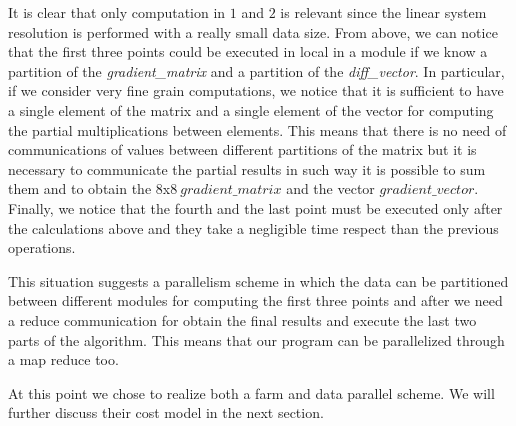 It is clear that only computation in $1$ and $2$ is relevant since the linear system resolution is performed with a really small data size.
From above, we can notice that the first three points could be executed in local in a module if we know a partition of the \textit{gradient\_matrix} and a partition of the \textit{diff\_vector}. In particular, if we consider very fine grain computations, we notice that it is sufficient to have a single element of the matrix and a single element of the vector for computing the partial multiplications between elements. This means that there is no need of communications of values between different partitions of the matrix but it is necessary to communicate the partial results in such way it is possible to sum them and to obtain the $8$x$8\ gradient\_matrix$ and the vector $gradient\_vector$. Finally, we notice that the fourth and the last point must be executed only after the calculations above and they take a negligible time respect than the previous operations.

This situation suggests a parallelism scheme in which the data can be partitioned between different modules for computing the first three points and after we need a reduce communication for obtain the final results and execute the last two parts of the algorithm. This means that our program can be parallelized through a map reduce too.

At this point we chose to realize both a farm and data parallel scheme. We will further discuss their cost model in the next section.